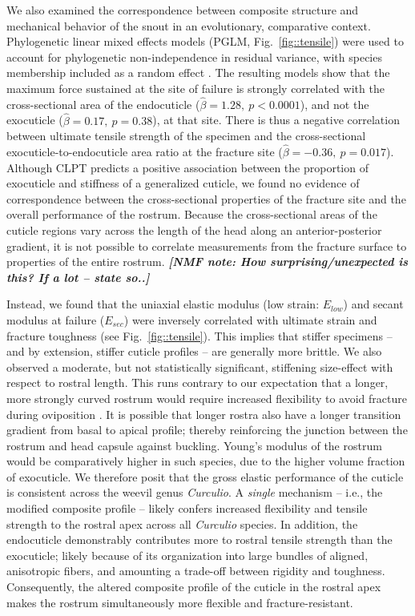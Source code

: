 \documentclass[twocolumn, linenumbers, superscriptaddress, nofootinbib]{revtex4-1}
\begin{document}
		We also examined the correspondence between composite structure and mechanical behavior of the snout in an evolutionary, comparative context.
		Phylogenetic linear mixed effects models (PGLM, Fig.~\ref{fig::tensile}) were used to account for phylogenetic non-independence in residual variance, with species membership included as a random effect \cite{Revell2010, Felsenstein1985}.
		The resulting models show that the maximum force sustained at the site of failure is strongly correlated with the cross-sectional area of the endocuticle ($\hat{\beta}=1.28,~p<0.0001$), and not the exocuticle ($\hat{\beta}=0.17,~p=0.38$), at that site.
		There is thus a negative correlation between ultimate tensile strength of the specimen and the cross-sectional exocuticle-to-endocuticle area ratio at the fracture site ($\hat{\beta}=-0.36,~p=0.017$).
		Although CLPT predicts a positive association between the proportion of exocuticle and stiffness of a generalized cuticle, we found no evidence of correspondence between the cross-sectional properties of the fracture site and the overall performance of the rostrum.
		Because the cross-sectional areas of the cuticle regions vary across the length of the head along an anterior-posterior gradient, it is not possible to correlate measurements from the fracture surface to properties of the entire rostrum.
		\textit{\textbf{[NMF note: How surprising/unexpected is this? If a lot -- state so..]}}
		
		Instead, we found that the uniaxial elastic modulus (low strain: $E_{low}$) and secant modulus at failure ($E_{sec}$) were inversely correlated with ultimate strain and fracture toughness (see Fig.~\ref{fig::tensile}).
		This implies that stiffer specimens -- and by extension, stiffer cuticle profiles -- are generally more brittle.
		We also observed a moderate, but not statistically significant, stiffening size-effect with respect to rostral length.
		This runs contrary to our expectation that a longer, more strongly curved rostrum would require increased flexibility to avoid fracture during oviposition \cite{Hughes2004eco, Bonal2011}.
		It is possible that longer rostra also have a longer transition gradient from basal to apical profile; thereby reinforcing the junction between the rostrum and head capsule against buckling.
		Young's modulus of the rostrum would be comparatively higher in such species, due to the higher volume fraction of exocuticle.
		We therefore posit that the gross elastic performance of the cuticle is consistent across the weevil genus \textit{Curculio}.
		A \emph{single} mechanism -- i.e., the modified composite profile -- likely confers increased flexibility and tensile strength to the rostral apex across all \textit{Curculio} species.
		In addition, the endocuticle demonstrably contributes more to rostral tensile strength than the exocuticle; likely because of its organization into large bundles of aligned, anisotropic fibers, and amounting a trade-off between rigidity and toughness.
		Consequently, the altered composite profile of the cuticle in the rostral apex makes the rostrum simultaneously more flexible and fracture-resistant.
		
\end{document}
